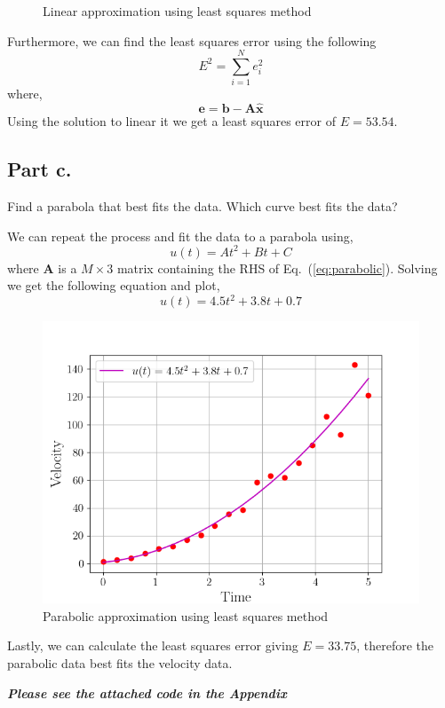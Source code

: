 \begin{mdframed}[style=MyFrame]
\begin{figure}[H]
        \caption{Linear approximation using least squares method}
    \end{figure}
    Furthermore, we can find the least squares error using the following 
    \begin{equation}
        E^{2} = \sum_{i=1}^{N} e_{i}^{2}
    \end{equation}
    where,
    \begin{equation}
        \mathbf{e} = \mathbf{b} - \mathbf{A} \mathbf{\widehat{x}}
    \end{equation}
    Using the solution to linear it we get a least squares error of
    $E=53.54$.
\end{mdframed}

\subsection{Part c.}
Find a parabola that best fits the data. Which curve best fits the data?
\begin{mdframed}[style=MyFrame]
    We can repeat the process and fit the data to a parabola
    using, 
    \begin{equation}
        u(t) = At^{2} + Bt + C
        \label{eq:parabolic}
    \end{equation}
    where $\mathbf{A}$ is a $M \times 3$ matrix containing the RHS of
    Eq.~(\ref{eq:parabolic}).
    Solving we get the following equation and plot,
    \begin{equation}
        u(t) = 4.5t^{2} + 3.8t + 0.7
    \end{equation}
    \begin{figure}[H]
        \includegraphics[height=0.35\textheight]{media/parabolic.png}
        \caption{Parabolic approximation using least squares method}
    \end{figure}
    Lastly, we can calculate the least squares error giving $E=33.75$,
    therefore the parabolic data best fits the velocity data. 
\end{mdframed}
\emph{\textbf{Please see the attached code in the Appendix}}

